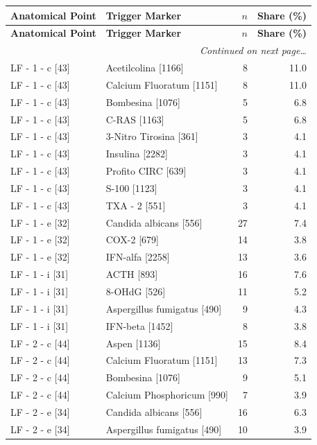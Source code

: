\documentclass[a4paper,11pt]{article}
\begin{document}
\begin{footnotesize}
\begin{longtable}{p{3.5cm}p{7.5cm}rr}
\toprule
\textbf{Anatomical Point} &
\textbf{Trigger Marker} &
\textbf{$n$} &
\textbf{Share (\%)} \\
\midrule
\endfirsthead
\toprule
\textbf{Anatomical Point} &
\textbf{Trigger Marker} &
\textbf{$n$} &
\textbf{Share (\%)} \\
\midrule
\endhead
\midrule
\multicolumn{4}{r}{\footnotesize\emph{Continued on next page\ldots}} \\
\endfoot
\bottomrule
\endlastfoot
LF - 1 - c [43] & Acetilcolina [1166] & 8 & 11.0 \\
LF - 1 - c [43] & Calcium Fluoratum [1151] & 8 & 11.0 \\
LF - 1 - c [43] & Bombesina [1076] & 5 & 6.8 \\
LF - 1 - c [43] & C-RAS [1163] & 5 & 6.8 \\
LF - 1 - c [43] & 3-Nitro Tirosina [361] & 3 & 4.1 \\
LF - 1 - c [43] & Insulina [2282] & 3 & 4.1 \\
LF - 1 - c [43] & Profito CIRC [639] & 3 & 4.1 \\
LF - 1 - c [43] & S-100 [1123] & 3 & 4.1 \\
LF - 1 - c [43] & TXA - 2 [551] & 3 & 4.1 \\
LF - 1 - e [32] & Candida albicans [556] & 27 & 7.4 \\
LF - 1 - e [32] & COX-2 [679] & 14 & 3.8 \\
LF - 1 - e [32] & IFN-alfa [2258] & 13 & 3.6 \\
LF - 1 - i [31] & ACTH [893] & 16 & 7.6 \\
LF - 1 - i [31] & 8-OHdG [526] & 11 & 5.2 \\
LF - 1 - i [31] & Aspergillus fumigatus [490] & 9 & 4.3 \\
LF - 1 - i [31] & IFN-beta [1452] & 8 & 3.8 \\
LF - 2 - c [44] & Aspen [1136] & 15 & 8.4 \\
LF - 2 - c [44] & Calcium Fluoratum [1151] & 13 & 7.3 \\
LF - 2 - c [44] & Bombesina [1076] & 9 & 5.1 \\
LF - 2 - c [44] & Calcium Phosphoricum [990] & 7 & 3.9 \\
LF - 2 - e [34] & Candida albicans [556] & 16 & 6.3 \\
LF - 2 - e [34] & Aspergillus fumigatus [490] & 10 & 3.9 \\

\end{longtable}
\end{footnotesize}
\end{document}
